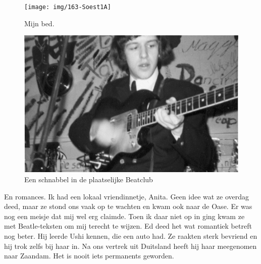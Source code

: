 \documentclass[10pt,twoside, openright]{memoir}
\begin{document}
\begin{figure}
\texttt{[image: img/163-Soest1A]}
\caption*{\footnotesize Mijn bed.}
\end{figure}

\begin{figure}
\includegraphics[width=\textwidth]{img/164beatclub}
\caption*{\footnotesize Een schnabbel in de plaatselijke Beatclub}
\end{figure}

En romances. Ik had een lokaal vriendinnetje, Anita. Geen idee wat ze overdag deed, maar ze stond ons vaak op te wachten en kwam ook naar de Oase. Er was nog een meisje dat mij wel erg claimde. Toen ik daar niet op in ging kwam ze met Beatle-teksten om mij terecht te wijzen. Ed deed het wat romantiek betreft nog beter. Hij leerde Ushi kennen, die een auto had. Ze raakten sterk bevriend en hij trok zelfs bij haar in. Na ons vertrek uit Duitsland heeft hij haar meegenomen naar Zaandam. Het is nooit iets permanents geworden.
\end{document}
